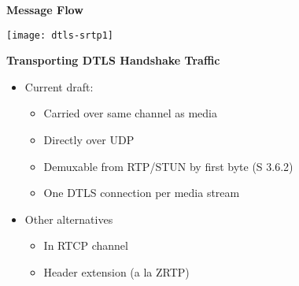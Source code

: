 \documentclass[helvetica,fancybox,landscape]{seminar}
\newcommand{\heading}[1]{%
  \begin{center} 
    \large\bf 
    #1 
  \end{center} 
  \vspace{.4 in}}
\begin{document}
\begin{slide}
\heading{Message Flow}

\vspace{-.4 in}
\texttt{[image: dtls-srtp1]}

\end{slide}


\begin{slide}
\heading{Transporting DTLS Handshake Traffic}

\begin{itemize}
\item Current draft:
\begin{itemize}
\item Carried over same channel as media
\item Directly over UDP
\item Demuxable from RTP/STUN by first byte (S 3.6.2)
\item One DTLS connection per media stream
\end{itemize}
\item Other alternatives
\begin{itemize}
\item In RTCP channel
\item Header extension (a la ZRTP)
\end{itemize}
\end{itemize}
\end{slide}
\end{document}
